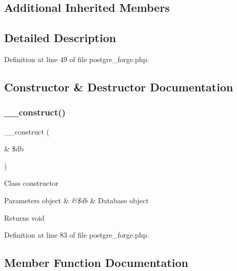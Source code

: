 \subsection*{Additional Inherited Members}


\subsection{Detailed Description}


Definition at line 49 of file postgre\+\_\+forge.\+php.



\subsection{Constructor \& Destructor Documentation}
\mbox{\label{class_c_i___d_b__postgre__forge_aaf2ef772755ec6f361d44e16cc9ffd69}} 
\subsubsection{\texorpdfstring{\_\_construct()}{\_\_construct()}}
{\footnotesize\ttfamily \+\_\+\+\_\+construct (\begin{DoxyParamCaption}\item[{\&}]{\$db }\end{DoxyParamCaption})}

Class constructor


\begin{DoxyParams}[1]{Parameters}
object & {\em \&\$db} & Database object \\
\hline
\end{DoxyParams}
\begin{DoxyReturn}{Returns}
void 
\end{DoxyReturn}


Definition at line 83 of file postgre\+\_\+forge.\+php.



\subsection{Member Function Documentation}
\mbox{\label{class_c_i___d_b__postgre__forge_a41c6cae02f2fda8b429ad0afb9509426}} 
